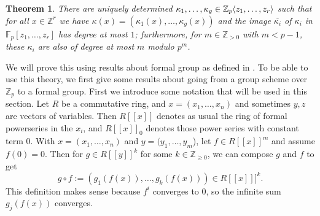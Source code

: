\documentclass[12pt]{article}
\newcommand{\Z}{\mathbb{Z}}
\newcommand{\F}{\mathbb{F}}
\renewcommand{\angle}[1]{\hspace{-2pt}\left\langle #1 \right\rangle}
\theoremstyle{plain}
\newtheorem{thm}{Theorem}[section] %
\theoremstyle{definition}
\theoremstyle{remark}
\begin{document}
\begin{thm}
\label{thm:kappanice}
There are uniquely determined $\kappa_1,\dots,\kappa_g \in \Z_p\angle{z_1,\dots,z_r}$ such that for all $x \in \Z^r$ we have $\kappa(x) = (\kappa_1(x),\dots,\kappa_g(x))$ and the image $\overline{\kappa_i}$ of $\kappa_i$ in $\F_p[z_1,\dots,z_r]$ has degree at most $1$; furthermore, for $m \in \Z_{>0}$ with $m<p-1$, these $\kappa_i$ are also of degree at most $m$ modulo $p^m$.
\end{thm}

We will prove this using results about formal group as defined in \citep{honda70}. To be able to use this theory, we first give some results about going from a group scheme over $\Z_p$ to a formal group.
First we introduce some notation that will be used in this section. Let $R$ be a commutative ring, and $x = (x_1,\dots,x_n)$ and sometimes $y,z$ are vectors of variables. Then $R[[x]]$ denotes as usual the ring of formal powerseries in the $x_i$, and $R[[x]]_0$ denotes those power series with constant term $0$. With $x = (x_1,\dots,x_n)$ and $y = (y_1,\dots,y_m$), let $f \in R[[x]]^m$ and assume $f(0) = 0$. Then for $g \in R[[y]]^k$ for some $k\in\Z_{\geq 0}$, we can compose $g$ and $f$ to get \[g\circ f := (g_1(f(x)),\dots,g_k(f(x)))\in R[[x]]]^k.\] This definition makes sense because $f^i$ converges to $0$, so the infinite sum $g_j(f(x))$ converges.
\end{document}
